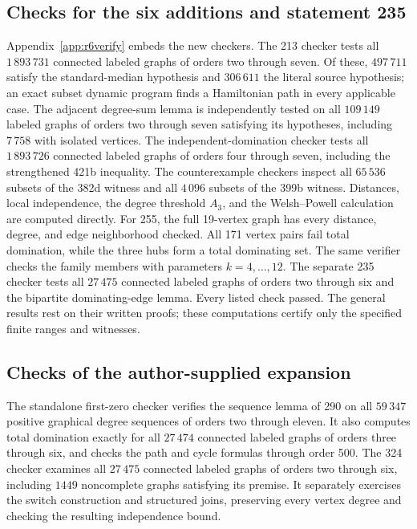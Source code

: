 \documentclass[11pt,a4paper]{article}
\theoremstyle{remark}
\begin{document}
\subsection{Checks for the six additions and statement 235}
Appendix~\ref{app:r6verify} embeds the new checkers. The 213 checker tests
all $1\,893\,731$ connected labeled graphs of orders two through seven.
Of these, $497\,711$ satisfy the standard-median hypothesis and $306\,611$
the literal source hypothesis; an exact subset dynamic program finds a
Hamiltonian path in every applicable case. The adjacent degree-sum lemma
is independently tested on all $109\,149$ labeled graphs of orders two
through seven satisfying its hypotheses, including $7\,758$ with isolated
vertices. The independent-domination
checker tests all $1\,893\,726$ connected labeled graphs of orders four
through seven, including the strengthened 421b inequality. The counterexample
checkers inspect all $65\,536$ subsets of the 382d witness and all $4\,096$
subsets of the 399b witness. Distances, local independence, the degree
threshold $A_3$, and the Welsh--Powell calculation are computed directly.
For 255, the full 19-vertex graph has every distance, degree, and edge
neighborhood checked. All 171 vertex pairs fail total domination, while
the three hubs form a total dominating set. The same verifier checks
the family members with parameters $k=4,\ldots,12$.
The separate 235 checker tests all $27\,475$ connected labeled graphs of
orders two through six and the bipartite dominating-edge lemma. Every
listed check passed. The general results rest on their written proofs;
these computations certify only the specified finite ranges and witnesses.

\begingroup\small\subsection{Checks of the author-supplied expansion}
The standalone first-zero checker verifies the sequence lemma of 290 on
all $59\,347$ positive graphical degree sequences of orders two through
eleven. It also computes total domination exactly for all $27\,474$
connected labeled graphs of orders three through six, and checks the
path and cycle formulas through order 500.
The 324 checker examines all $27\,475$ connected labeled graphs of
orders two through six, including $1449$ noncomplete graphs satisfying
its premise. It separately exercises the switch construction and
structured joins, preserving every vertex degree and checking the
resulting independence bound.
\end{document}
